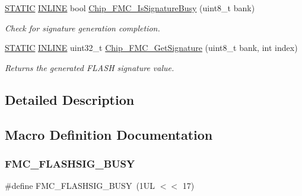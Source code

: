 \begin{DoxyCompactItemize}
\hyperlink{group___l_p_c___types___public___macros_ga10b2d890d871e1489bb02b7e70d9bdfb}{S\+T\+A\+T\+IC} \hyperlink{spifi__18xx__43xx_8h_a2eb6f9e0395b47b8d5e3eeae4fe0c116}{I\+N\+L\+I\+NE} bool \hyperlink{group___f_m_c__18_x_x__43_x_x_gaaa287615692d7b693b16ea2b92bb5763}{Chip\+\_\+\+F\+M\+C\+\_\+\+Is\+Signature\+Busy} (uint8\+\_\+t bank)
\begin{DoxyCompactList}\small\item\em Check for signature generation completion. \end{DoxyCompactList}\item 
\hyperlink{group___l_p_c___types___public___macros_ga10b2d890d871e1489bb02b7e70d9bdfb}{S\+T\+A\+T\+IC} \hyperlink{spifi__18xx__43xx_8h_a2eb6f9e0395b47b8d5e3eeae4fe0c116}{I\+N\+L\+I\+NE} uint32\+\_\+t \hyperlink{group___f_m_c__18_x_x__43_x_x_gae1022883a7bf2e9094d76e2a9b0aafc6}{Chip\+\_\+\+F\+M\+C\+\_\+\+Get\+Signature} (uint8\+\_\+t bank, int index)
\begin{DoxyCompactList}\small\item\em Returns the generated F\+L\+A\+SH signature value. \end{DoxyCompactList}\end{DoxyCompactItemize}


\subsection{Detailed Description}


\subsection{Macro Definition Documentation}
\mbox{\label{group___f_m_c__18_x_x__43_x_x_ga1c732efb3127d9e699c46b4a89706639}} 
\subsubsection{\texorpdfstring{F\+M\+C\+\_\+\+F\+L\+A\+S\+H\+S\+I\+G\+\_\+\+B\+U\+SY}{FMC\_FLASHSIG\_BUSY}}
{\footnotesize\ttfamily \#define F\+M\+C\+\_\+\+F\+L\+A\+S\+H\+S\+I\+G\+\_\+\+B\+U\+SY~(1\+U\+L $<$$<$ 17)}



